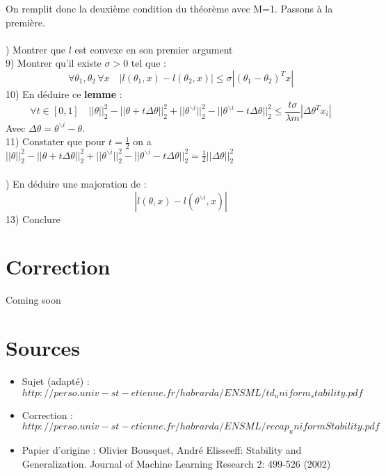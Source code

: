 \documentclass[12pt]{article}
\begin{document}
On remplit donc la deuxième condition du théorème avec M=1.    
Passons à la première.   \\ \\
) Montrer que $l$ est convexe en son premier argument   \\
9) Montrer qu'il existe $\sigma > 0$ tel que :
$$ \forall \theta_1,\theta_2 \, \forall x \quad |l(\theta_1,x)-l(\theta_2,x)| \leq \sigma |(\theta_1 - \theta_2)^T x|$$      
10) En déduire ce \textbf{lemme} :      
$$ \forall t \in [0,1] \quad ||\theta||^2_2 - ||\theta + t \Delta \theta||_2^2 + ||\theta^{ \backslash i}||_2^2 - ||\theta^{ \backslash i} - t \Delta \theta||_2^2 \leq \frac{t \sigma}{\lambda m}|\Delta \theta^T x_i| $$   
Avec $\Delta \theta = \theta^{ \backslash i} - \theta$.   \\ 
11) Constater que pour $t=\frac{1}{2}$ on a $||\theta||^2_2 - ||\theta + t \Delta \theta||_2^2 + ||\theta^{ \backslash i}||_2^2 - ||\theta^{ \backslash i} - t \Delta \theta||_2^2 = \frac{1}{2}||\Delta \theta||^2_2$   \\ \\
) En déduire une majoration de : 
$$ |l(\theta,x)-l(\theta^{ \backslash i},x)| $$    
13) Conclure

\section{Correction}
Coming soon

\section{Sources}
\begin{itemize}
\item Sujet (adapté) : $http://perso.univ-st-etienne.fr/habrarda/ENSML/td_uniform_stability.pdf$     
\item Correction : $http://perso.univ-st-etienne.fr/habrarda/ENSML/recap_uniformStability.pdf $       
\item Papier d'origine : 
Olivier Bousquet, André Elisseeff: Stability and Generalization. Journal of Machine Learning Research 2: 499-526 (2002)
\end{itemize}
\end{document}
